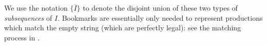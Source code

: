 \documentclass[10pt]{article}
\newcommand{\todocite}[1]{\footnote{cite: #1}}
\newcommand{\leftmost}[1]{\text{leftmost}(#1)}
\newcommand{\rightmost}[1]{\text{rightmost}(#1)}
\newcommand{\generalsubseq}{\overbar{I}}
\newcommand{\subseqset}{\{\generalsubseq\}}
\newcommand{\substringwith}[2]{\overbar{I}_{(#1,#2)}}
\newcommand{\canonicalleftend}{l_1}
\newcommand{\canonicalrightend}{l_2}
\newcommand{\canonicalsubstring}{\substringwith{\canonicalleftend}{\canonicalrightend}}
\newcommand{\bookmarkwith}[1]{\widehat{I}_{(#1)}}
\newcommand{\canonicalbookmarkindex}{l^+}
\newcommand{\canonicalbookmark}{\bookmarkwith{\canonicalbookmarkindex}}
\begin{document}
We use the notation $\subseqset$ to denote the disjoint union of these two types of \textit{subsequences} of $I$. Bookmarks are essentially only needed to represent productions which match the empty string (which are perfectly legal): see the matching process in .



\end{document}
